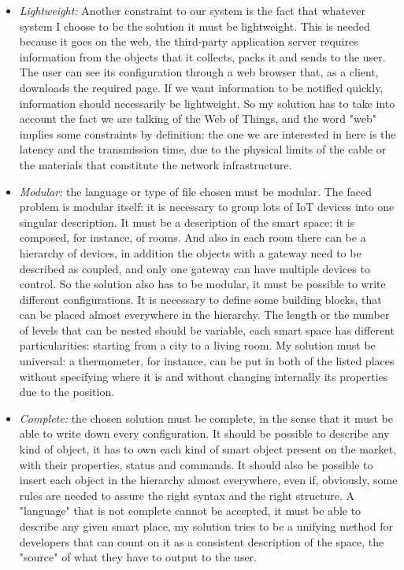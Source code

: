 \begin{itemize}
	\item \textit{Lightweight:} Another constraint to our system is the fact that whatever system I choose to be the solution it must be lightweight. This is needed because it goes on the web, the third-party application server requires information from the objects that it collects, packs it and sends to the user. The user can see its configuration through a web browser that, as a client, downloads the required page. If we want information to be notified quickly, information should necessarily  be lightweight. So my solution has to take into account the fact we are talking of the Web of Things, and the word "web" implies some constraints by definition: the one we are interested in here is the latency and the transmission time, due to the physical limits of the cable or the materials that constitute the network infrastructure. 
	
	\item \textit{Modular:} the language or type of file chosen must be modular. The faced problem is modular itself: it is necessary to group lots of IoT devices into one singular description. It must be a description of the smart space: it is composed, for instance, of rooms. And also in each room there can be a hierarchy of devices, in addition the objects with a gateway need to be described as coupled, and only one gateway can have multiple devices to control. So the solution also has to be modular, it must be possible to write different configurations. It is necessary to define some building blocks, that can be placed almost everywhere in the hierarchy. The length or the number of levels that can be nested should be variable, each smart space has different particularities: starting from a city to a living room. My solution must be universal: a thermometer, for instance, can be put in both of the listed places without specifying where it is and without changing internally its properties due to the position.
		
	\item \textit{Complete:} the chosen solution must be complete, in the sense that it must be able to write down every configuration. It should be possible to describe any kind of object, it has to own each kind of smart object present on the market, with their properties, status and commands. It should also be possible to insert each object in the hierarchy almost everywhere, even if, obviously, some rules are needed to assure the right syntax and the right structure. A "language" that is not complete cannot be accepted, it must be able to describe any given smart place, my solution tries to be a unifying method for developers that can count on it as a consistent description of the space, the "source" of what they have to output to the user.
	

\end{itemize}
